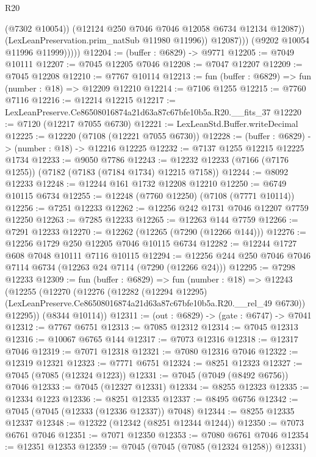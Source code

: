 \begin{lexlean}{R20}
\begin{coremodule}
{                        (@7302 @10054))
                      (@12124 @250 @7046 @7046 @12058 @6734 @12134 @12087))
                    (LexLeanPreservation.prim_natSub @11980 @11996))
                  @12087)))
            (@9202 @10054 @11996 @11999)))))
@12204 := (buffer : @6829) -> @9771
@12205 := @7049 @10111
@12207 := @7045 @12205 @7046
@12208 := @7047 @12207
@12209 := @7045 @12208
@12210 := @7767 @10114
@12213 := fun (buffer : @6829) => fun (number : @18) => @12209 @12210
@12214 := @7106 @1255
@12215 := @7760 @7116
@12216 := @12214 @12215
@12217 := LexLeanPreserve.Ce86508016874a21d63a87c67bfe10b5a.R20.__fits_37
@12220 := @7120 (@12217 @7055 @6730)
@12221 := LexLeanStd.Buffer.writeDecimal
@12225 := @12220 (@7108 (@12221 @7055 @6730))
@12228 := (buffer : @6829) -> (number : @18) -> @12216 @12225
@12232 := @7137 @1255 @12215 @12225 @1734
@12233 := @9050 @7786
@12243 := @12232 @12233 (@7166 (@7176 @1255)) (@7182 (@7183 (@7184 @1734) @12215 @7158))
@12244 := @8092 @12233
@12248 := @12244 @161 @1732 @12208 @12210
@12250 := @6749 @10115 @6734
@12255 := @12248 (@7760 @12250) (@7108 (@7771 @10114))
@12256 := @7251 @12233
@12262 := @12256 @242 @1731 @7046 @12207 @7759 @12250
@12263 := @7285 @12233
@12265 := @12263 @144 @7759
@12266 := @7291 @12233
@12270 := @12262 (@12265 (@7290 (@12266 @144)))
@12276 := @12256 @1729 @250 @12205 @7046 @10115 @6734
@12282 := @12244 @1727 @608 @7048 @10111 @7116 @10115
@12294 := @12256 @244 @250 @7046 @7046 @7114 @6734 (@12263 @24 @7114 (@7290 (@12266 @24)))
@12295 := @7298 @12233
@12309 := fun (buffer : @6829) =>
  fun (number : @18) =>
  @12243
    (@12255
      (@12270
        (@12276
          (@12282
            (@12294 @12295)
            (LexLeanPreserve.Ce86508016874a21d63a87c67bfe10b5a.R20.__rel_49 @6730))
          @12295))
      (@8344 @10114))
@12311 := (out : @6829) -> (gate : @6747) -> @7041
@12312 := @7767 @6751
@12313 := @7085 @12312
@12314 := @7045 @12313
@12316 := @10067 @6765 @144
@12317 := @7073 @12316
@12318 := @12317 @7046
@12319 := @7071 @12318
@12321 := @7080 @12316 @7046
@12322 := @12319 @12321
@12323 := @7771 @6751
@12324 := @8251 @12323
@12327 := @7045 (@7085 (@12324 @1223))
@12331 := @7045 (@7049 (@8492 @6756)) @7046
@12333 := @7045 (@12327 @12331)
@12334 := @8255 @12323
@12335 := @12334 @1223
@12336 := @8251 @12335
@12337 := @8495 @6756
@12342 := @7045 (@7045 (@12333 (@12336 @12337)) @7048)
@12344 := @8255 @12335 @12337
@12348 := @12322 (@12342 (@8251 @12344 @1244))
@12350 := @7073 @6761 @7046
@12351 := @7071 @12350
@12353 := @7080 @6761 @7046
@12354 := @12351 @12353
@12359 := @7045 (@7045 (@7085 (@12324 @1258)) @12331)
}
\end{coremodule}
\end{lexlean}
